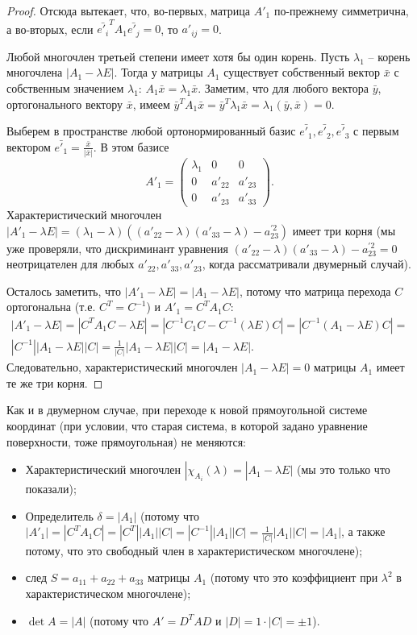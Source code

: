 \documentclass[a4paper, 12pt]{article}
\theoremstyle{definition}
\begin{document}
\begin{proof}
    Отсюда вытекает, что, во-первых, матрица $A'_1$ по-прежнему симметрична, а во-вторых, если $\bar{e'_i}^T A_1 \bar{e'_j} = 0$, то $a'_{ij} = 0$.

    Любой многочлен третьей степени имеет хотя бы один корень. Пусть $\lambda_1$ – корень многочлена $|A_1 - \lambda E|$.
    Тогда у матрицы $A_1$ существует собственный вектор $\bar{x}$ с собственным значением $\lambda_1$: $A_1 \bar{x} = \lambda_1 \bar{x}$.
    Заметим, что для любого вектора $\bar{y}$, ортогонального вектору $\bar{x}$, имеем $\bar{y}^T A_1 \bar{x} = \bar{y}^T \lambda_1 \bar{x} = \lambda_1 (\bar{y}, \bar{x}) = 0$.

    Выберем в пространстве любой ортонормированный базис $\bar{e'_1}, \bar{e'_2}, \bar{e'_3}$ с первым вектором $\bar{e'_1} = \frac{\bar{x}}{|\bar{x}|}$.
    В этом базисе
    \[A'_1 = 
    \begin{pmatrix}
        \lambda_1 & 0 & 0 \\
        0 & a'_{22} & a'_{23} \\
        0 & a'_{23} & a'_{33}
    \end{pmatrix}.
    \]
    Характеристический многочлен $|A'_1 - \lambda E| = (\lambda_1 - \lambda)((a'_{22} - \lambda)(a'_{33} - \lambda) - a_{23}^{'2})$ имеет три корня
    (мы уже проверяли, что дискриминант уравнения $(a'_{22} - \lambda)(a'_{33} - \lambda) - a_{23}^{'2} = 0$ неотрицателен для любых $a'_{22}, a'_{33}, a'_{23}$, когда рассматривали двумерный случай).

    Осталось заметить, что $|A'_1 - \lambda E| = |A_1 - \lambda E|$, потому что матрица перехода $C$ ортогональна (т.е. $C^T = C^{-1}$) и $A'_1 = C^T A_1 C$:
    \begin{multline*}
        |A'_1 - \lambda E| = |C^T A_1 C - \lambda E| = |C^{-1} C_1 C - C^{-1} (\lambda E) C| = |C^{-1} (A_1 - \lambda E) C| =\\ |C^{-1}| |A_1 - \lambda E| |C| = \frac{1}{|C|} |A_1 - \lambda E| |C| = |A_1 - \lambda E|.
    \end{multline*}
    Следовательно, характеристический многочлен $|A_1 - \lambda E| = 0$ матрицы $A_1$ имеет те же три корня.
\end{proof}

Как и в двумерном случае, при переходе к новой прямоугольной системе координат (при условии, что старая система, в которой задано уравнение поверхности, тоже прямоугольная) не меняются:

\begin{itemize}
    \item Характеристический многочлен $| \chi_{A_i} (\lambda) = |A_1 - \lambda E|$ (мы это только что показали);
    \item Определитель $\delta = |A_1|$ (потому что $|A'_1| = |C^T A_1 C| = |C^T| |A_1| |C| = |C^{-1}| |A_1| |C| = \frac{1}{|C|} |A_1| |C| = |A_1|$, а также потому, что это свободный член в характеристическом многочлене);
    \item след $S = a_{11} + a_{22} + a_{33}$ матрицы $A_1$ (потому что это коэффициент при $\lambda^2$ в характеристическом многочлене);
    \item $\det{A} = |A|$ (потому что $A' = D^T A D$ и $|D| = 1 \cdot |C| = \pm 1$).
\end{itemize}
\end{document}
